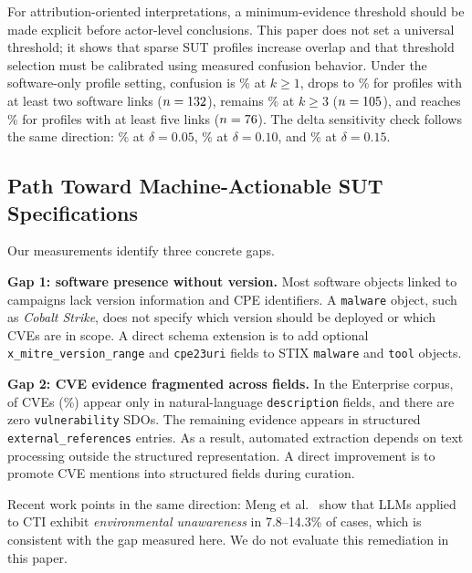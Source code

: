 \documentclass[sigconf,anonymous,review]{acmart}
\newcommand{\stix}{STIX\xspace}
\newcommand{\myparagraph}[1]{\textbf{#1.}\hspace{0.5em}}
\begin{document}
For attribution-oriented interpretations, a minimum-evidence threshold should be made explicit before actor-level conclusions. This paper does not set a universal threshold; it shows that sparse SUT profiles increase overlap and that threshold selection must be calibrated using measured confusion behavior. Under the software-only profile setting, confusion is \thresholdkoneconfusionpct\% at $k \geq 1$, drops to \thresholdktwoconfusionpct\% for profiles with at least two software links ($n=132$), remains \thresholdkthreeconfusionpct\% at $k \geq 3$ ($n=105$), and reaches \thresholdkfiveconfusionpct\% for profiles with at least five links ($n=76$). The delta sensitivity check follows the same direction: \deltazerozerofiveconfusionpct\% at $\delta=0.05$, \deltazerotenconfusionpct\% at $\delta=0.10$, and \deltazerofifteenconfusionpct\% at $\delta=0.15$.

\subsection{Path Toward Machine-Actionable SUT Specifications}

Our measurements identify three concrete gaps.

\myparagraph{Gap 1: software presence without version}
Most software objects linked to campaigns lack version information and CPE identifiers. A \texttt{malware} object, such as \emph{Cobalt Strike}, does not specify which version should be deployed or which CVEs are in scope. A direct schema extension is to add optional \texttt{x\_mitre\_version\_range} and \texttt{cpe23uri} fields to \stix{} \texttt{malware} and \texttt{tool} objects.

\myparagraph{Gap 2: CVE evidence fragmented across fields}
In the Enterprise corpus, \cvefreetextonlycount{} of \cveuniquecount{} CVEs (\cvefromfreetextpct\%) appear only in natural-language \texttt{description} fields, and there are zero \texttt{vulnerability} SDOs. The remaining evidence appears in structured \texttt{external\_references} entries. As a result, automated extraction depends on text processing outside the structured representation. A direct improvement is to promote CVE mentions into structured fields during curation.

Recent work points in the same direction: Meng et al.~\cite{meng2025uncoveringvulnerabilitiesllmassistedcti} show that LLMs applied to CTI exhibit \emph{environmental unawareness} in 7.8--14.3\% of cases, which is consistent with the gap measured here. We do not evaluate this remediation in this paper.
\end{document}
